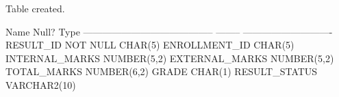 
\begin{sqlout}
Table created.

 Name                                      Null?    Type
 ----------------------------------------- -------- ----------------------------
 RESULT_ID                                 NOT NULL CHAR(5)
 ENROLLMENT_ID                                      CHAR(5)
 INTERNAL_MARKS                                     NUMBER(5,2)
 EXTERNAL_MARKS                                     NUMBER(5,2)
 TOTAL_MARKS                                        NUMBER(6,2)
 GRADE                                              CHAR(1)
 RESULT_STATUS                                      VARCHAR2(10)
\end{sqlout}

\clearpage
